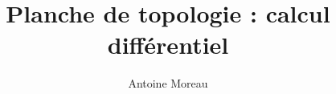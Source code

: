 \documentclass[a4paper,10pt]{article}
\title{Planche de topologie : calcul diff\'erentiel}
\author{Antoine Moreau}
\begin{document}
\maketitle

\begin{abstract}

\end{abstract}


\end{document}
